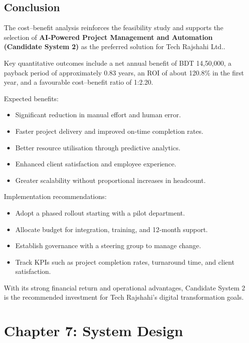 \documentclass[12pt,a4paper]{article}
\newcommand{\company}[1]{#1}
\begin{document}
\subsection{Conclusion}
The cost–benefit analysis reinforces the feasibility study and supports the selection of \textbf{AI‑Powered Project Management and Automation (Candidate System 2)} as the preferred solution for \company{Tech Rajshahi Ltd.}.  

Key quantitative outcomes include a net annual benefit of BDT 14,50,000, a payback period of approximately 0.83 years, an ROI of about 120.8\% in the first year, and a favourable cost–benefit ratio of 1:2.20.

Expected benefits:
\begin{itemize}
    \item Significant reduction in manual effort and human error.
    \item Faster project delivery and improved on‑time completion rates.
    \item Better resource utilisation through predictive analytics.
    \item Enhanced client satisfaction and employee experience.
    \item Greater scalability without proportional increases in headcount.
\end{itemize}

Implementation recommendations:
\begin{itemize}
    \item Adopt a phased rollout starting with a pilot department.
    \item Allocate budget for integration, training, and 12‑month support.
    \item Establish governance with a steering group to manage change.
    \item Track KPIs such as project completion rates, turnaround time, and client satisfaction.
\end{itemize}

With its strong financial return and operational advantages, Candidate System 2 is the recommended investment for Tech Rajshahi's digital transformation goals.

\newpage
\section{Chapter 7: System Design}
\end{document}
